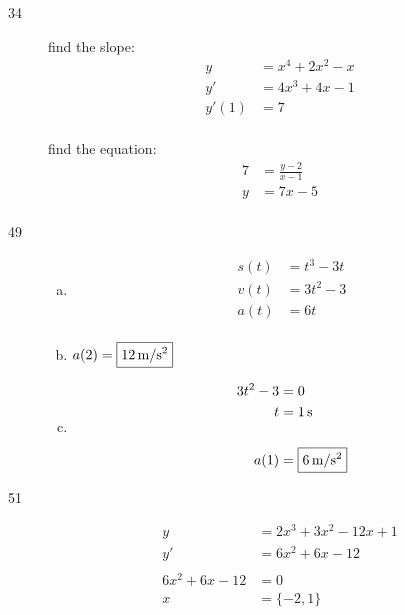 \documentclass[letterpaper, landscape]{exam}
\begin{document}
\begin{description}
    \item[34] 
      find the slope: 
      \begin{align*}
        y     & = x^4 + 2x^2 - x \\
        y'    & = 4x^3 + 4x - 1 \\
        y'(1) & = 7 \\
      \end{align*}

      find the equation:
      \begin{align*}
        7 & = \frac{y - 2}{x - 1} \\
        y & = \boxed{ 7x - 5 } \\
      \end{align*}
      
    \item[49]
      \begin{enumerate}[(a)]
        \item 
          \begin{align*}
            s(t) &= t^3 - 3t \\
            v(t) &= 3t^2 - 3 \\
            a(t) &= 6t \\
          \end{align*}

        \item $a(2) = \boxed{ \unit[12]{m/s^2} }$

        \item
          \begin{align*}
            3t^2 - 3 & = 0 \\
            t        & = \unit[1]{s} \\
            \\
            a(1)     & = \boxed{ \unit[6]{m/s^2} } \\
          \end{align*}

      \end{enumerate}

    \item[51]
      \begin{align*}
        y              & = 2x^3 + 3x^2 - 12x + 1 \\
        y'             & = 6x^2 + 6x - 12 \\
        \\
        6x^2 + 6x - 12 & = 0 \\
        x              & = \{ -2, 1 \} \\
      \end{align*}


\end{description}
\end{document}
